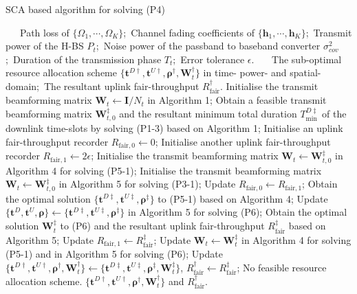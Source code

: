 \documentclass[12pt,draftcls,onecolumn,journal]{IEEEtran}
\begin{document}
\begin{algorithm}[!t]
	\caption{SCA based algorithm for solving (P4)}
	\footnotesize
	\begin{algorithmic}[1]
		\REQUIRE ~~\
		Path loss of $\{\Omega_1,\cdots,\Omega_K\}$;\
		Channel fading coefficients of $\{\mathbf{h}_1,\cdots,\mathbf{h}_K\}$;\
		Transmit power of the H-BS $P_{t}$;\
		Noise power of the passband to baseband converter $\sigma^2_{cov}$;\
		Duration of the transmission phase $T_t$;\
		Error tolerance $\epsilon$.
		\ENSURE ~~\
		The sub-optimal resource allocation scheme $\{\mathbf{t}^{D\dagger}, \mathbf{t}^{U\dagger}, \boldsymbol{\rho}^{\dagger}, \mathbf{W}_t^{\dagger}\}$ in time- power- and spatial-domain;\
		The resultant uplink fair-throughput $R_{\text{fair}}^{\dagger}$.
		\STATE Initialise the transmit beamforming matrix $\mathbf{W}_t\leftarrow \mathbf{I} / N_t$ in Algorithm 1;
		\STATE Obtain a feasible transmit beamforming matrix $\mathbf{W}_{t,0}^{\ddagger}$ and the resultant minimum total duration $T_{\min}^{D\ddagger}$ of the downlink time-slots by solving (P1-3) based on Algorithm 1;
		\IF{$T_{\min}^{D\ddagger} < T_t$}
			\STATE Initialise an uplink fair-throughput recorder $R_{\text{fair},0}\leftarrow 0$;
			\STATE Initialise another uplink fair-throughput recorder $R_{\text{fair},1}\leftarrow 2\epsilon$;
			\STATE Initialise the transmit beamforming matrix $\mathbf{W}_t\leftarrow \mathbf{W}_{t,0}^{\ddagger}$ in Algorithm 4 for solving (P5-1);
			\STATE Initialise the transmit beamforming matrix $\mathbf{W}_t\leftarrow \mathbf{W}_{t,0}^{\ddagger}$ in Algorithm 5 for solving (P3-1);
				\STATE Update $R_{\text{fair},0}\leftarrow R_{\text{fair},1}$;
				\STATE Obtain the optimal solution $\{\mathbf{t}^{D\ddagger}, \mathbf{t}^{U\ddagger}, \boldsymbol{\rho}^{\ddagger}\}$ to (P5-1) based on Algorithm 4;
				\STATE Update $\{\mathbf{t}^{D}, \mathbf{t}^{U}, \boldsymbol{\rho}\}\leftarrow \{\mathbf{t}^{D\ddagger}, \mathbf{t}^{U\ddagger}, \boldsymbol{\rho}^{\ddagger}\}$ in Algorithm 5 for solving (P6);
				\STATE Obtain the optimal solution $\mathbf{W}_t^{\ddagger}$ to (P6) and the resultant uplink fair-throughput $R_{\text{fair}}^{\ddagger}$ based on Algorithm 5;
				\STATE Update $R_{\text{fair},1}\leftarrow R_{\text{fair}}^{\ddagger}$;
				\STATE Update $\mathbf{W}_t \leftarrow \mathbf{W}_t^{\ddagger}$ in Algorithm 4 for solving (P5-1) and in Algorithm 5 for solving (P6);
			\ENDWHILE
			\STATE Update $\{\mathbf{t}^{D\dagger}, \mathbf{t}^{U\dagger}, \boldsymbol{\rho}^{\dagger}, \mathbf{W}_t^{\dagger}\} \leftarrow \{\mathbf{t}^{D\ddagger}, \mathbf{t}^{U\ddagger}, \boldsymbol{\rho}^{\ddagger}, \mathbf{W}_t^{\ddagger}\}$, $R_{\text{fair}}^{\dagger}\leftarrow R_{\text{fair}}^{\ddagger}$;
		\ELSE
			\STATE No feasible resource allocation scheme.
		\ENDIF
		\RETURN $\{\mathbf{t}^{D\dagger}, \mathbf{t}^{U\dagger}, \boldsymbol{\rho}^{\dagger}, \mathbf{W}_t^{\dagger}\}$ and $R_{\text{fair}}^{\dagger}$.
	\end{algorithmic}
\end{algorithm}
\end{document}
